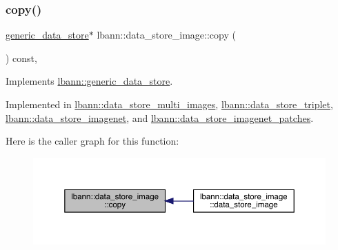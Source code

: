 \subsubsection{\texorpdfstring{copy()}{copy()}}
{\footnotesize\ttfamily \hyperlink{classlbann_1_1generic__data__store}{generic\+\_\+data\+\_\+store}$\ast$ lbann\+::data\+\_\+store\+\_\+image\+::copy (\begin{DoxyParamCaption}{ }\end{DoxyParamCaption}) const\hspace{0.3cm}{\ttfamily [override]}, {}}



Implements \hyperlink{classlbann_1_1generic__data__store_ae06e089790aa023b839be508a3c020c6}{lbann\+::generic\+\_\+data\+\_\+store}.



Implemented in \hyperlink{classlbann_1_1data__store__multi__images_a1046efda9448bab9b42e9fcdf71e03f1}{lbann\+::data\+\_\+store\+\_\+multi\+\_\+images}, \hyperlink{classlbann_1_1data__store__triplet_a446ee3b1fa3097e51bd0e198de960cd4}{lbann\+::data\+\_\+store\+\_\+triplet}, \hyperlink{classlbann_1_1data__store__imagenet_ae3b0d31ac020c36f41766999288e2d25}{lbann\+::data\+\_\+store\+\_\+imagenet}, and \hyperlink{classlbann_1_1data__store__imagenet__patches_a5067e8299f5cf073497a5005ee9db759}{lbann\+::data\+\_\+store\+\_\+imagenet\+\_\+patches}.

Here is the caller graph for this function\+:\nopagebreak
\begin{figure}[H]
\begin{center}
\leavevmode
\includegraphics[width=350pt]{classlbann_1_1data__store__image_ab62efcb2dbe3118bf2815fa5d51fee61_icgraph}
\end{center}
\end{figure}
\mbox{\label{classlbann_1_1data__store__image_a5ff5eccbd469caca692e8259f6f8c021}} 
